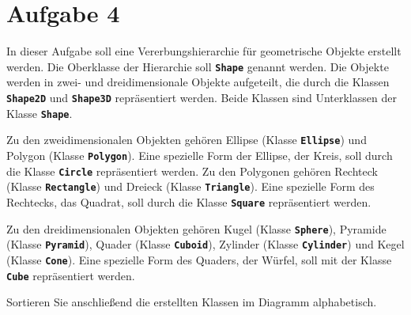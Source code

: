 \documentclass[12pt]{article}
\begin{document}
\section*{Aufgabe 4}

In dieser Aufgabe soll eine Vererbungshierarchie für geometrische Objekte erstellt werden. Die Oberklasse der Hierarchie soll \texttt{\textbf{Shape}} genannt werden. Die Objekte werden in zwei- und dreidimensionale Objekte aufgeteilt, die durch die Klassen \texttt{\textbf{Shape2D}} und \texttt{\textbf{Shape3D}} repräsentiert werden. Beide Klassen sind Unterklassen der Klasse \texttt{\textbf{Shape}}.

Zu den zweidimensionalen Objekten gehören Ellipse (Klasse \texttt{\textbf{Ellipse}}) und Polygon (Klasse \texttt{\textbf{Polygon}}). Eine spezielle Form der Ellipse, der Kreis, soll durch die Klasse \texttt{\textbf{Circle}} repräsentiert werden. Zu den Polygonen gehören Rechteck (Klasse \texttt{\textbf{Rectangle}}) und Dreieck (Klasse \texttt{\textbf{Triangle}}). Eine spezielle Form des Rechtecks, das Quadrat, soll durch die Klasse \texttt{\textbf{Square}} repräsentiert werden.

Zu den dreidimensionalen Objekten gehören Kugel (Klasse \texttt{\textbf{Sphere}}), Pyramide (Klasse \texttt{\textbf{Pyramid}}), Quader (Klasse \texttt{\textbf{Cuboid}}), Zylinder (Klasse \texttt{\textbf{Cylinder}}) und Kegel (Klasse \texttt{\textbf{Cone}}). Eine spezielle Form des Quaders, der Würfel, soll mit der Klasse \texttt{\textbf{Cube}} repräsentiert werden.

Sortieren Sie anschließend die erstellten Klassen im Diagramm alphabetisch.
\end{document}

